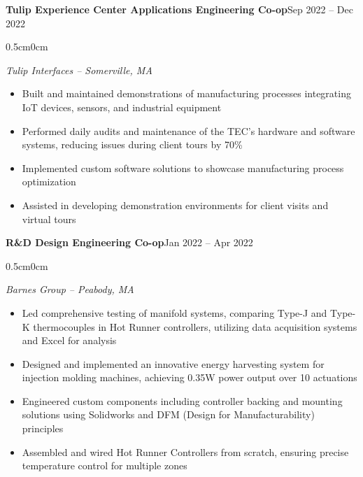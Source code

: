 \documentclass[10pt]{article}
\newenvironment{onecolentry}{
    \begin{adjustwidth}{0.5cm}{0cm}
}{
    \end{adjustwidth}
}
\newenvironment{highlights}{
    \begin{itemize}[
        leftmargin=0.5cm,
        rightmargin=0cm,
        itemindent=0cm,
        labelwidth=0.3cm,
        labelsep=0.2cm,
        align=left,
        itemsep=0.05cm,
        topsep=0.05cm,
        parsep=0.05cm,
        partopsep=0pt
    ]
}{
    \end{itemize}
    \vspace{0.1cm}
}
\begin{document}
    \begin{twocolentry}{\textbf{Tulip Experience Center Applications Engineering Co-op}}{Sep 2022 -- Dec 2022}
    \end{twocolentry}
    \begin{onecolentry}
    \textit{Tulip Interfaces -- Somerville, MA}
    \begin{highlights}
        \item Built and maintained demonstrations of manufacturing processes integrating IoT devices, sensors, and industrial equipment
        \item Performed daily audits and maintenance of the TEC's hardware and software systems, reducing issues during client tours by 70\%
        \item Implemented custom software solutions to showcase manufacturing process optimization
        \item Assisted in developing demonstration environments for client visits and virtual tours
    \end{highlights}
    \end{onecolentry}

    \begin{twocolentry}{\textbf{R\&D Design Engineering Co-op}}{Jan 2022 -- Apr 2022}
    \end{twocolentry}
    \begin{onecolentry}
    \textit{Barnes Group -- Peabody, MA}
    \begin{highlights}
        \item Led comprehensive testing of manifold systems, comparing Type-J and Type-K thermocouples in Hot Runner controllers, utilizing data acquisition systems and Excel for analysis
        \item Designed and implemented an innovative energy harvesting system for injection molding machines, achieving 0.35W power output over 10 actuations
        \item Engineered custom components including controller backing and mounting solutions using Solidworks and DFM (Design for Manufacturability) principles
        \item Assembled and wired Hot Runner Controllers from scratch, ensuring precise temperature control for multiple zones
    \end{highlights}
    \end{onecolentry}
\end{document}
